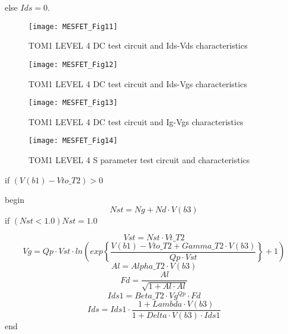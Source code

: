 else $Ids = 0$.
\begin{figure} 
  \centering
  \texttt{[image: MESFET\_Fig11]} 
  \caption{TOM1 LEVEL 4 DC test circuit and Ids-Vds characteristics}  
  \label{fig:fig11}
\end{figure} 

\begin{figure} 
  \centering
  \texttt{[image: MESFET\_Fig12]} 
  \caption{TOM1 LEVEL 4 DC test circuit and Ids-Vgs characteristics} 
  \label{fig:fig12}
\end{figure} 

\begin{figure} 
  \centering
  \texttt{[image: MESFET\_Fig13]} 
  \caption{TOM1 LEVEL 4 DC test circuit and Ig-Vgs characteristics} 
  \label{fig:fig13}
\end{figure} 

\begin{figure} 
  \centering
  \texttt{[image: MESFET\_Fig14]}  
  \caption{TOM1 LEVEL 4 S parameter test circuit and characteristics} 
  \label{fig:fig14}
\end{figure} 


if $ (V(b1) - Vto\_T2) > 0$

\hspace{10mm}    begin
			\begin{equation}
			 	Nst = Ng + Nd \cdot V(b3)
			\end{equation}
\hspace{20mm} if $ (Nst < 1.0 ) Nst = 1.0$
			
			\begin{equation}
			Vst = Nst \cdot Vt\_T2 
			\end{equation}
			\begin{equation}
			 Vg = Qp \cdot Vst \cdot ln\left(  exp \left\lbrace \dfrac{V(b1)-Vto\_T2+Gamma\_T2 \cdot V(b3)}{Qp \cdot Vst} \right\rbrace +1 \right) 
			\end{equation}
			\begin{equation}
			 Al = Alpha\_T2 \cdot V(b3)
			\end{equation}
			\begin{equation}
			 Fd = \dfrac{Al}{\sqrt{1+Al \cdot Al}}
			\end{equation}
			\begin{equation}
			 Ids1 = Beta\_T2\cdot Vg^{Qp} \cdot Fd
			\end{equation}
			\begin{equation}
			 Ids = Ids1 \cdot \dfrac{1+Lambda \cdot V(b3)}{1+Delta \cdot V(b3) \cdot Ids1}
			\end{equation}
\hspace{10mm}    end


